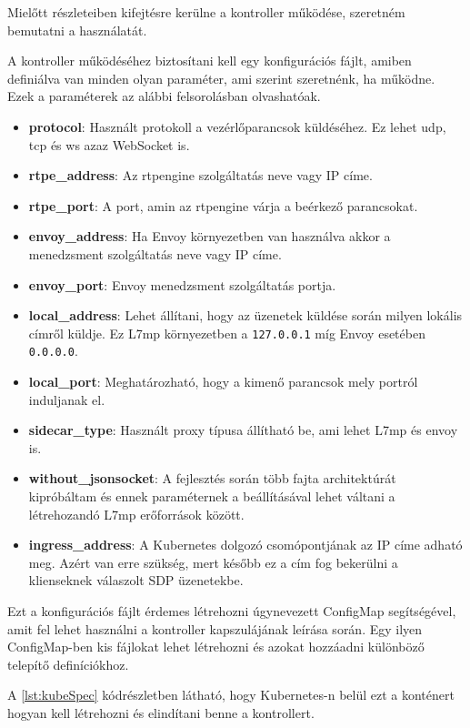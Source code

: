 Mielőtt részleteiben kifejtésre kerülne a kontroller működése, szeretném bemutatni a
használatát.

A kontroller működéséhez biztosítani kell egy konfigurációs fájlt, amiben definiálva
van minden olyan paraméter, ami szerint szeretnénk, ha működne. Ezek a paraméterek
az alábbi felsorolásban olvashatóak.

\begin{itemize}
	\item \textbf{protocol}: Használt protokoll a vezérlőparancsok küldéséhez. Ez lehet
	udp, tcp és ws azaz WebSocket is.
	\item \textbf{rtpe\_address}: Az rtpengine szolgáltatás neve vagy IP címe. 
	\item \textbf{rtpe\_port}: A port, amin az rtpengine várja a beérkező parancsokat. 
	\item \textbf{envoy\_address}: Ha Envoy környezetben van használva akkor a menedzsment
	szolgáltatás neve vagy IP címe. 
	\item \textbf{envoy\_port}: Envoy menedzsment szolgáltatás portja. 
	\item \textbf{local\_address}: Lehet állítani, hogy az üzenetek küldése során milyen
	lokális címről küldje. Ez L7mp környezetben a \texttt{127.0.0.1} míg Envoy esetében 
	\texttt{0.0.0.0}.
	\item \textbf{local\_port}: Meghatározható, hogy a kimenő parancsok mely portról
	induljanak el. 
	\item \textbf{sidecar\_type}: Használt proxy típusa állítható be, ami lehet L7mp és 
	envoy is.
	\item \textbf{without\_jsonsocket}: A fejlesztés során több fajta architektúrát 
	kipróbáltam és ennek paraméternek a beállításával lehet váltani a létrehozandó L7mp 
	erőforrások között. 
	\item \textbf{ingress\_address}: A Kubernetes dolgozó csomópontjának az IP címe 
	adható meg. Azért van erre szükség, mert később ez a cím fog bekerülni a klienseknek 
	válaszolt SDP üzenetekbe. 
\end{itemize}

Ezt a konfigurációs fájlt érdemes létrehozni úgynevezett ConfigMap segítségével, amit 
fel lehet használni a kontroller kapszulájának leírása során. Egy ilyen ConfigMap-ben kis 
fájlokat lehet létrehozni és azokat hozzáadni különböző telepítő definíciókhoz. 

A \ref{lst:kubeSpec} kódrészletben látható, hogy Kubernetes-n belül ezt a konténert 
hogyan kell létrehozni és elindítani benne a kontrollert. 

